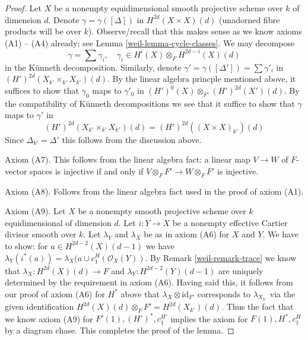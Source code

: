 \begin{proof}
\medskip\noindent
Let $X$ be a nonempty equidimensional smooth projective scheme
over $k$ of dimension $d$. Denote $\gamma = \gamma([\Delta])$
in $H^{2d}(X \times X)(d)$ (unadorned fibre products will be over $k$).
Observe/recall that this makes sense as we know axioms (A1) -- (A4) already;
see Lemma \ref{weil-lemma-cycle-classes}. We may decompose
$$
\gamma = \sum \gamma_i, \quad
\gamma_i \in H^i(X) \otimes_F H^{2d - i}(X)(d)
$$
in the K\"unneth decomposition. Similarly, denote
$\gamma' = \gamma([\Delta']) = \sum \gamma'_i$
in $(H')^{2d}(X_{k'} \times_{k'} X_{k'})(d)$.
By the linear algebra princple mentioned above, it suffices
to show that $\gamma_0$ maps to $\gamma'_0$ in
$(H')^0(X) \otimes_{F'} (H')^{2d}(X')(d)$.
By the compatibility of K\"unneth decompositions
we see that it suffice to show that $\gamma$ maps to
$\gamma'$ in
$$
(H')^{2d}(X_{k'} \times_{k'} X_{k'})(d) = (H')^{2d}((X \times X)_{k'})(d)
$$
Since $\Delta_{k'} = \Delta'$ this follows from the discussion above.

\medskip\noindent
Axiom (A7). This follows from the linear algebra fact: a
linear map $V \to W$ of $F$-vector spaces is injective
if and only if $V \otimes_F F' \to W \otimes_F F'$ is injective.

\medskip\noindent
Axiom (A8). Follows from the linear algebra fact used in
the proof of axiom (A1).

\medskip\noindent
Axiom (A9). Let $X$ be a nonempty smooth projective scheme over $k$
equidimensional of dimension $d$. Let $i : Y \to X$ be a nonempty
effective Cartier divisor smooth over $k$.
Let $\lambda_Y$ and $\lambda_X$ be as in axiom (A6) for $X$ and $Y$.
We have to show: for $a \in H^{2d - 2}(X)(d - 1)$
we have $\lambda_Y(i^*(a)) = \lambda_X(a \cup c_1^H(\mathcal{O}_X(Y))$.
By Remark \ref{weil-remark-trace}
we know that $\lambda_X : H^{2d}(X)(d) \to F$ and
$\lambda_Y : H^{2d - 2}(Y)(d - 1)$ are uniquely
determined by the requirement in axiom (A6).
Having said this, it follows from our proof of axiom (A6) for $H^*$ above
that $\lambda_X \otimes \text{id}_{F'}$ corresponds to $\lambda_{X_{k'}}$
via the given identification $H^{2d}(X)(d) \otimes_F F' = H^{2d}(X_{k'})(d)$.
Thus the fact that we know axiom (A9) for $F'(1), (H')^*, c_1^{H'}$
implies the axiom for $F(1), H^*, c_1^H$ by a diagram chase.
This completes the proof of the lemma.
\end{proof}



